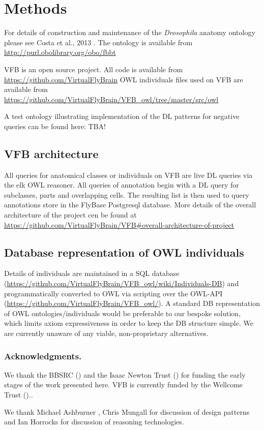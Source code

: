 \documentclass[runningheads,a4paper]{llncs}
\begin{document}
\section{Methods}

For details of construction and maintenance of the \textit{Drosophila}
anatomy ontology please see Costa et al., 2013 \cite{Costa2013}. The
ontology is available from \url{http://purl.obolibrary.org/obo/fbbt}

VFB is an open source project.  All code is available from \url{https://github.com/VirtualFlyBrain}
OWL individuals files used on VFB are available from 
\url{https://github.com/VirtualFlyBrain/VFB_owl/tree/master/src/owl} %

A test ontology illustrating implementation of the DL patterns for
negative queries can be found here: TBA!

\subsection{VFB architecture}

All queries for anatomical classes or individuals on VFB are live DL
queries via the elk OWL reasoner.  All queries of annotation begin
with a DL query for subclasses, parts and overlapping cells.  The
resulting list is then used to query annotations store in the FlyBase
Postgresql database.  More details of the overall architecture of the
project cen be found at
\url{https://github.com/VirtualFlyBrain/VFB#overall-architecture-of-project}


\subsection{Database representation of OWL individuals}
 
Details of individuals are maintained in a SQL database
(\url{https://github.com/VirtualFlyBrain/VFB_owl/wiki/Individuals-DB})
and programmatically converted to OWL via scripting over the OWL-API
(\url{https://github.com/VirtualFlyBrain/VFB_owl/}).  A standard DB
representation of OWL ontologies/individuals would be preferable to
our bespoke solution, which limits axiom expressiveness in order to
keep the DB structure simple.  We are currently unaware of any viable,
non-proprietary alternatives.


\subsubsection*{Acknowledgments.} 

We thank the BBSRC () and the Isaac Newton Trust () for funding the
early stages of the work presented here.  VFB is currently funded by
the Wellcome Trust ()..

We thank Michael Ashburner , Chris Mungall for discussion of design patterns and Ian
Horrocks for discussion of reasoning technologies.





\end{document}
